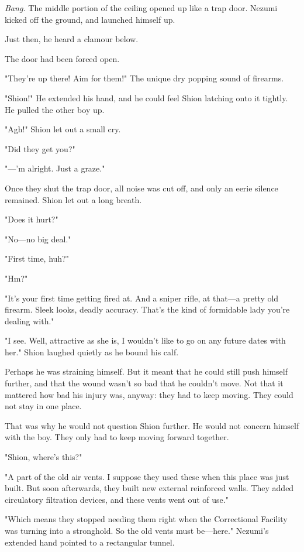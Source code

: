 \emph{Bang.} The middle portion of the ceiling opened up like a trap door.
Nezumi kicked off the ground, and launched himself up.

Just then, he heard a clamour below.

The door had been forced open.

"They're up there! Aim for them!" The unique dry popping sound of
firearms.

"Shion!" He extended his hand, and he could feel Shion latching onto it
tightly. He pulled the other boy up.

"Agh!" Shion let out a small cry.

"Did they get you?"

"---'m alright. Just a graze."

Once they shut the trap door, all noise was cut off, and only an eerie
silence remained. Shion let out a long breath.

"Does it hurt?"

"No---no big deal."

"First time, huh?"

"Hm?"

"It's your first time getting fired at. And a sniper rifle, at that---a
pretty old firearm. Sleek looks, deadly accuracy. That's the kind of
formidable lady you're dealing with."

"I see. Well, attractive as she is, I wouldn't like to go on any future
dates with her." Shion laughed quietly as he bound his calf.

Perhaps he was straining himself. But it meant that he could still push
himself further, and that the wound wasn't so bad that he couldn't move.
Not that it mattered how bad his injury was, anyway: they had to keep
moving. They could not stay in one place.

That was why he would not question Shion further. He would not concern
himself with the boy. They only had to keep moving forward together.

"Shion, where's this?"

"A part of the old air vents. I suppose they used these when this place
was just built. But soon afterwards, they built new external reinforced
walls. They added circulatory filtration devices, and these vents went
out of use."

"Which means they stopped needing them right when the Correctional
Facility was turning into a stronghold. So the old vents must be---here."
Nezumi's extended hand pointed to a rectangular tunnel.

